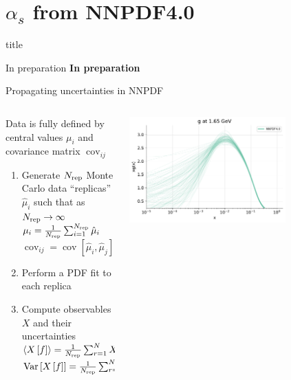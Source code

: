 \documentclass[8pt,t]{beamer}
\newcommand{\SectionTitleFrame}[1][]{%
  \begin{frame}
    \vfill
    \centering
    \begin{beamercolorbox}[sep=8pt,center,shadow=true,rounded=true]{title}
      \usebeamerfont{title}\insertsection\par
    \end{beamercolorbox}
    \ifx\relax#1\relax\else
      \vspace{0.5cm}
      \textbf{#1}
    \fi
    \vfill
  \end{frame}
}
\begin{document}
\section*{$\alpha_s$ from NNPDF4.0}
\SectionTitleFrame[In preparation]

\begin{frame}{Propagating uncertainties in NNPDF}
  \begin{columns}
    \begin{column}{0.49\textwidth}
      Data is fully defined by central values $\mu_i$ and covariance matrix $\operatorname{cov}_{ij}$
      \begin{enumerate}
        \item Generate $N_{\rm rep}$ { Monte Carlo data} ``replicas'' $\hat{\mu}_i$ such that as $N_{\rm rep}\to \infty$ \\
        $\mu_i = \frac{1}{N_{\rm rep}}\sum_{i=1}^{N_{\rm rep}} \hat{\mu}_i$\\
        $\operatorname{cov}_{ij} = \operatorname{cov}[\hat{\mu}_i, \hat{\mu}_j]$
        \item Perform a { PDF fit} to each replica
        \item Compute observables $X$ and their uncertainties\\
        $\left\langle X\left[f\right]\right\rangle=\frac{1}{N_{\rm rep}} \sum_{r=1}^N X\left[f^{(r)}\right]$\\
        $\operatorname{Var}\left[X\left[f\right]\right] = \frac{1}{N_{\rm rep}} \sum_{r=1}^{N_{\rm rep}}\left(X\left[f^{(r)}\right]-\left\langle X\left[f\right]\right\rangle\right)^2$
      \end{enumerate}
    \end{column}
    \begin{column}{0.49\textwidth}
      \begin{center}
        \includegraphics[width=0.7\textwidth]{replicas_g.pdf}\\

\end{center}
\end{column}
\end{columns}
\end{frame}
\end{document}
